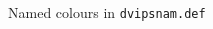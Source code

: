 \documentclass[12pt,letter]{article}
\begin{document}
 \renewcommand*{\DefineNamedColor}[4]{%
    \textcolor[named]{#2}{\rule{7mm}{7mm}}\quad
    \texttt{#2}\strut\\}
 
 \begin{center}\Large Named colours in \texttt{dvipsnam.def}
 \end{center}
 \begin{multicols}{3}
 
 \end{multicols}
 
\end{document}
